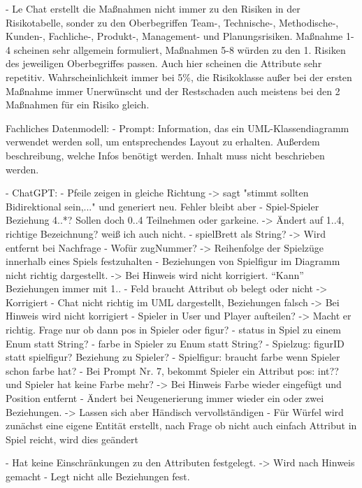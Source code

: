         - Le Chat erstellt die Maßnahmen nicht immer zu den Risiken in der Risikotabelle, sonder zu den Oberbegriffen Team-, Technische-, Methodische-, 
        Kunden-, Fachliche-, Produkt-, Management- und Planungsrisiken. Maßnahme 1-4 scheinen sehr allgemein formuliert, Maßnahmen 5-8 würden
        zu den 1. Risiken des jeweiligen Oberbegriffes passen. Auch hier scheinen die Attribute sehr repetitiv. Wahrscheinlichkeit immer bei 5\%,
        die Risikoklasse außer bei der ersten Maßnahme immer Unerwünscht und der Restschaden auch meistens bei den 2 Maßnahmen für ein Risiko gleich.




Fachliches Datenmodell:
- Prompt: Information, das ein UML-Klassendiagramm verwendet werden soll, um entsprechendes Layout zu erhalten. 
Außerdem beschreibung, welche Infos benötigt werden. Inhalt muss nicht beschrieben werden.

- ChatGPT: 
    - Pfeile zeigen in gleiche Richtung -> sagt "stimmt sollten Bidirektional sein,..." und generiert neu. Fehler bleibt aber
    - Spiel-Spieler Beziehung 4..*? Sollen doch 0..4 Teilnehmen oder garkeine. -> Ändert auf 1..4, richtige Bezeichnung? weiß ich auch nicht.
    - spielBrett als String? -> Wird entfernt bei Nachfrage
    - Wofür zugNummer? -> Reihenfolge der Spielzüge innerhalb eines Spiels festzuhalten
    - Beziehungen von Spielfigur im Diagramm nicht richtig dargestellt. -> Bei Hinweis wird nicht korrigiert. ``Kann'' Beziehungen immer mit 1..
    - Feld braucht Attribut ob belegt oder nicht -> Korrigiert
    - Chat nicht richtig im UML dargestellt, Beziehungen falsch -> Bei Hinweis wird nicht korrigiert
    - Spieler in User und Player aufteilen? -> Macht er richtig. Frage nur ob dann pos in Spieler oder figur?
    - status in Spiel zu einem Enum statt String?
    - farbe in Spieler zu Enum statt String?
    - Spielzug: figurID statt spielfigur? Beziehung zu Spieler?
    - Spielfigur: braucht farbe wenn Spieler schon farbe hat?
    - Bei Prompt Nr. 7, bekommt Spieler ein Attribut pos: int?? und Spieler hat keine Farbe mehr? -> Bei Hinweis Farbe wieder eingefügt und Position entfernt
    - Ändert bei Neugenerierung immer wieder ein oder zwei Beziehungen. -> Lassen sich aber Händisch vervollständigen
    - Für Würfel wird zunächst eine eigene Entität erstellt, nach Frage ob nicht auch einfach Attribut in Spiel reicht, wird dies geändert

    - Hat keine Einschränkungen zu den Attributen festgelegt. -> Wird nach Hinweis gemacht
    - Legt nicht alle Beziehungen fest.

